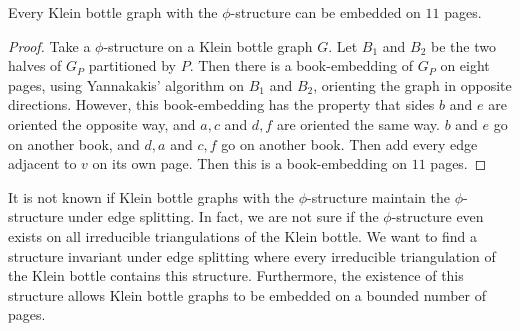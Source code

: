 \begin{proposition}
    Every Klein bottle graph with the $\phi$-structure can be embedded on $11$ pages. 
\end{proposition}
\begin{proof}
    Take a $\phi$-structure on a Klein bottle graph $G$. Let $B_1$ and $B_2$ be the two halves of $G_P$ partitioned by $P$. Then there is a book-embedding of $G_P$ on eight pages, using Yannakakis' algorithm on $B_1$ and $B_2$, orienting the graph in opposite directions. However, this book-embedding has the property that sides $b$ and $e$ are oriented the opposite way, and $a, c$ and $d, f$ are oriented the same way. $b$ and $e$ go on another book, and $d, a$ and $c, f$ go on another book. Then add every edge adjacent to $v$ on its own page. Then this is a book-embedding on $11$ pages. 
\end{proof}

It is not known if Klein bottle graphs with the $\phi$-structure maintain the $\phi$-structure under edge splitting. In fact, we are not sure if the $\phi$-structure even exists on all irreducible triangulations of the Klein bottle. We want to find a structure invariant under edge splitting where every irreducible triangulation of the Klein bottle contains this structure. Furthermore, the existence of this structure allows Klein bottle graphs to be embedded on a bounded number of pages.
